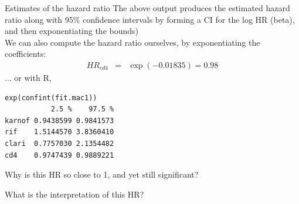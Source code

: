 \documentclass[envcountsect, 10pt, portrait, palatino]{beamer}
\begin{document}
\begin{frame}[fragile]{Estimates of the hazard ratio}
The above output produces the estimated hazard
ratio along with 95\% confidence intervals by forming a CI for the log HR (beta), 
and then exponentiating the bounds)
\\[2ex]
We can also compute the hazard ratio ourselves, by
exponentiating the coefficients:
\begin{eqnarray*}
HR_{cd4} & = & \exp(-0.01835) = 0.98
\end{eqnarray*}
... or with R, 

\small
\begin{verbatim}
exp(confint(fit.mac1))
           2.5 %    97.5 %
karnof 0.9438599 0.9841573
rif    1.5144570 3.8360410
clari  0.7757030 2.1354482
cd4    0.9747439 0.9889221
\end{verbatim}

Why is this HR so close to 1, and yet still significant?
\end{frame}
\begin{frame}[fragile]{What is the interpretation of this HR?}
\end{frame}
\end{document}
